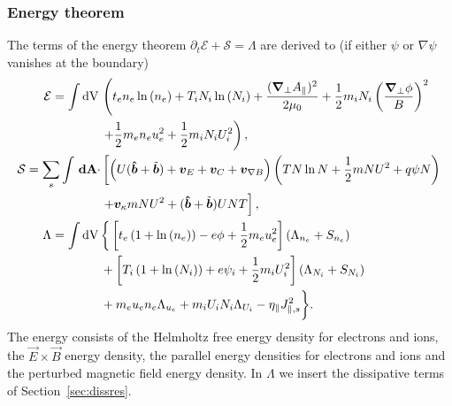 \subsubsection{Energy theorem}
The terms of the energy theorem $\partial_t \mathcal E + \mathcal S =
\Lambda$ are derived to (if either $\psi$ or $\nabla\psi$ vanishes at the
boundary)
\begin{align} \label{eq:energy_conservation}
  \mathcal{E} = \int  \mathrm{dV}\, & \left( t_e n_e \ln{(n_e)} +T_i N_i\ln{(N_i)}+
    \frac{({\boldsymbol{\nabla}}_\perp A_\parallel)^2}{2\mu_0} 
    +\frac{1}{2} m_i N_i \left(\frac{{\boldsymbol{\nabla}}_\perp\phi}{B}\right)^2 \right.\nonumber\\
    &\left.+\frac{1}{2} m_e  n_e u_e^2 +\frac{1}{2} m_i  N_i U_i^2  \right),\\
  \mathcal S = \sum_s \int {\boldsymbol{\,\mathrm{dA}}} \cdot &\left[ \left(
  U(\bm{\hat{b}}+\tilde{{\boldsymbol{b}}}) + {\boldsymbol{v}}_E + {\boldsymbol{v}}_C + {\boldsymbol{v}}_{\nabla B} \right)
  \left(T N\ln N + \frac{1}{2}m NU^2 + q\psi N \right) \right. \nonumber\\
  & \left . + {\boldsymbol{v}}_\kappa m NU^2  + (\bm{\hat{b}} + \tilde{{\boldsymbol{b}}}) UNT\right], \\
  \Lambda =  \int \mathrm{dV}\, & \bigg\{  \left[t_e\left( 1+\ln{(n_e)}\right) -e \phi + \frac{1}{2} m_e u_e^2 \right](\Lambda_{n_e} + S_{n_e})
  \nonumber\\ &
+\left[T_i\left( 1+\ln{(N_i)}\right) +e \psi_i + \frac{1}{2} m_i U_i^2 \right](\Lambda_{N_i}+S_{N_i})
\nonumber \\ &
+ m_e u_e n_e \Lambda_{u_e}+m_iU_i N_i \Lambda_{U_i}- \eta_\parallel J_{\parallel,s}^2\bigg\}.
\end{align}
The energy consists of the Helmholtz free energy density for electrons and ions, the \(\vec{E} \times \vec{B}\) energy density, the parallel energy densities for electrons and ions and the perturbed magnetic field energy density.
In \(\Lambda\) we insert the dissipative terms of Section~\ref{sec:dissres}. \\

